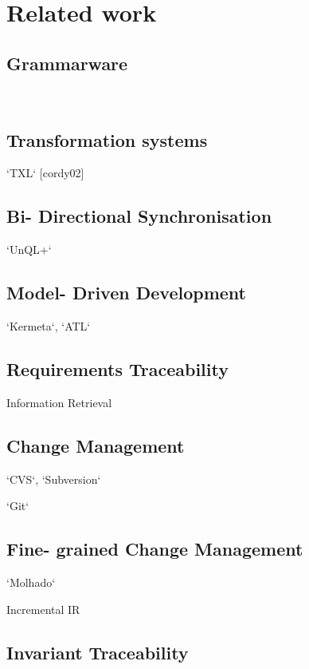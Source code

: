 \documentclass{acm_proc_article-sp}
\begin{document}
\section{Related work}
\subsection{Grammarware}
 
   ~\cite{klint05tosem}
   
\subsection{Transformation systems}

   `TXL` [cordy02]
   
\subsection{Bi- Directional Synchronisation}

   `UnQL+`
   
\subsection{Model- Driven Development}

   `Kermeta`, `ATL`
   
\subsection{Requirements Traceability}

   Information Retrieval
   
\subsection{Change Management}

   `CVS`, `Subversion`
   
   `Git`
   
\subsection{Fine- grained Change Management}

   `Molhado`
   
   Incremental IR
   
\subsection{Invariant Traceability}
\end{document}
